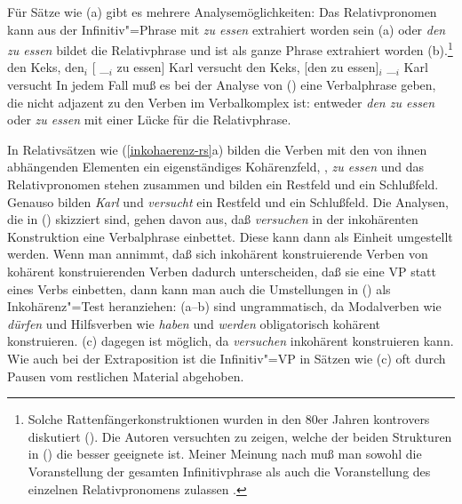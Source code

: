 Für Sätze wie (a) gibt es mehrere Analysemöglichkeiten: Das Relativpronomen kann aus der
Infinitiv"=Phrase mit \emph{zu essen} extrahiert worden sein (a)
oder \emph{den zu essen} bildet die Relativphrase und ist als ganze Phrase extrahiert 
worden (b).\footnote{
  Solche Rattenfängerkonstruktionen wurden in den 80er Jahren kontrovers diskutiert
  (\citealp*{Riemsdijk85,Haider85c,Grewendorf86,Trissler88,Riemsdijk94}). Die Autoren
  versuchten zu zeigen, welche der beiden Strukturen in () die besser geeignete ist.
  Meiner Meinung nach muß man sowohl die Voranstellung der gesamten Infinitivphrase
  als auch die Voranstellung des einzelnen Relativpronomens zulassen \citep[Kapitel~10.7]{Mueller99a}.
}
\eal
\ex den Keks, den$_i$ [ \_$_i$ zu essen] Karl versucht
\ex den Keks, [den zu essen]$_i$ \_$_i$ Karl versucht
\zl
In jedem Fall muß es bei der Analyse von () eine Verbalphrase
geben, die nicht adjazent zu den Verben im Verbalkomplex ist: entweder \emph{den zu essen} oder
\emph{zu essen} mit einer Lücke für die Relativphrase.

In Relativsätzen wie (\ref{inkohaerenz-rs}a) bilden die Verben mit den von ihnen abhängenden Elementen ein
eigenständiges Kohärenzfeld, \dash, \emph{zu essen} und das Relativpronomen stehen zusammen
und bilden ein Restfeld und ein Schlußfeld. Genauso bilden \emph{Karl} und \emph{versucht} ein
Restfeld und ein Schlußfeld. Die Analysen, die in () skizziert sind, gehen davon aus, daß
\emph{versuchen} in der inkohärenten Konstruktion eine Verbalphrase einbettet. Diese kann dann als
Einheit umgestellt werden. Wenn man annimmt, daß sich inkohärent konstruierende Verben von
kohärent konstruierenden Verben dadurch unterscheiden, daß sie eine VP statt eines Verbs einbetten, dann kann man
auch die Umstellungen in () als Inkohärenz"=Test heranziehen:
(a--b) sind ungrammatisch, da Modalverben wie \emph{dürfen} und Hilfsverben wie
\emph{haben} und \emph{werden} obligatorisch kohärent konstruieren. 
(c) dagegen ist möglich, da \emph{versuchen} inkohärent konstruieren kann.
\eal
{}
\zl
Wie auch bei der Extraposition ist die Infinitiv"=VP in Sätzen wie (c) oft
durch Pausen vom restlichen Material abgehoben.%


